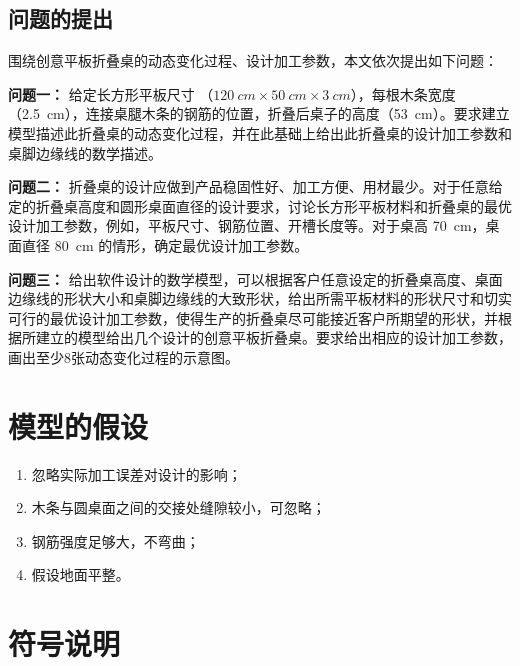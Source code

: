 \documentclass[bwprint]{gmcmthesis}
\begin{document}
\subsection{问题的提出}


\noindent 围绕创意平板折叠桌的动态变化过程、设计加工参数，本文依次提出如下问题：

\textbf{问题一：} 给定长方形平板尺寸 （$\SI{120}{cm} \times \SI{50}{cm} \times \SI{3}{cm}$），每根木条宽度（\SI{2.5}{cm}），连接桌腿木条的钢筋的位置，折叠后桌子的高度（\SI{53}{cm}）。要求建立模型描述此折叠桌的动态变化过程，并在此基础上给出此折叠桌的设计加工参数和桌脚边缘线的数学描述。


\textbf{问题二：} 折叠桌的设计应做到产品稳固性好、加工方便、用材最少。对于任意给定的折叠桌高度和圆形桌面直径的设计要求，讨论长方形平板材料和折叠桌的最优设计加工参数，例如，平板尺寸、钢筋位置、开槽长度等。对于桌高 \SI{70}{cm}，桌面直径 \SI{80}{cm} 的情形，确定最优设计加工参数。


\textbf{问题三：} 给出软件设计的数学模型，可以根据客户任意设定的折叠桌高度、桌面边缘线的形状大小和桌脚边缘线的大致形状，给出所需平板材料的形状尺寸和切实可行的最优设计加工参数，使得生产的折叠桌尽可能接近客户所期望的形状，并根据所建立的模型给出几个设计的创意平板折叠桌。要求给出相应的设计加工参数，画出至少8张动态变化过程的示意图。



\clearpage
\section{模型的假设}

\begin{enumerate}
\item 忽略实际加工误差对设计的影响；
\item 木条与圆桌面之间的交接处缝隙较小，可忽略；
\item 钢筋强度足够大，不弯曲；
\item 假设地面平整。
\end{enumerate}



\section{符号说明}
\end{document}
